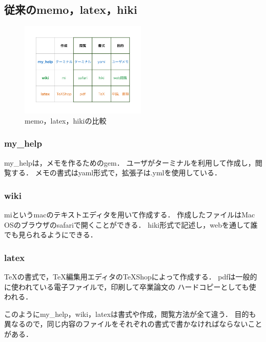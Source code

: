\subsection{従来のmemo，latex，hiki}
\begin{figure}[htbp]\begin{center}
\includegraphics[width=6cm,bb=0 0 442 500]{../figs/./my_help2hiki_saki.003.png}
\caption{ memo，latex，hikiの比較}
\label{default}\end{center}\end{figure}
\subsubsection{my\_help}
my\_helpは，メモを作るためのgem．
ユーザがターミナルを利用して作成し，閲覧する．
メモの書式はyaml形式で，拡張子は.ymlを使用している．

\subsubsection{wiki}
miというmacのテキストエディタを用いて作成する．
作成したファイルはMac OSのブラウザのsafariで開くことができる．
hiki形式で記述し，webを通して誰でも見られるようにできる．

\subsubsection{latex}
TeXの書式で，TeX編集用エディタのTeXShopによって作成する．
pdfは一般的に使われている電子ファイルで，印刷して卒業論文の
ハードコピーとしても使われる．

このようにmy\_help，wiki，latexは書式や作成，閲覧方法が全て違う．
目的も異なるので，同じ内容のファイルをそれぞれの書式で書かなければならないことがある．

